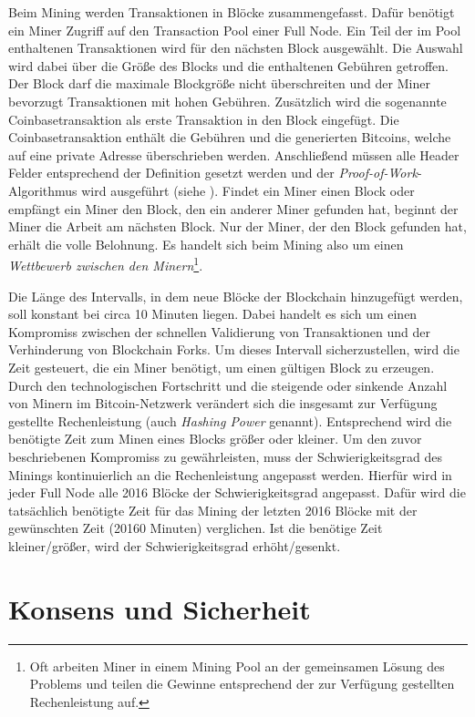 \documentclass[ngerman,runningheads,a4paper]{llncs}[2018/03/10]
\begin{document}
Beim Mining werden Transaktionen in Blöcke zusammengefasst. Dafür benötigt ein Miner Zugriff auf den Transaction Pool einer Full Node. Ein Teil der im Pool enthaltenen Transaktionen wird für den nächsten Block ausgewählt. Die Auswahl wird dabei über die Größe des Blocks und die enthaltenen Gebühren getroffen. Der Block darf die maximale Blockgröße nicht überschreiten und der Miner bevorzugt Transaktionen mit hohen Gebühren. Zusätzlich wird die sogenannte Coinbasetransaktion als erste Transaktion in den Block eingefügt. Die Coinbasetransaktion enthält die Gebühren und die generierten Bitcoins, welche auf eine private Adresse überschrieben werden. Anschließend müssen alle Header Felder entsprechend der Definition gesetzt werden und der \textit{Proof-of-Work}-Algorithmus wird ausgeführt (siehe ). Findet ein Miner einen Block oder empfängt ein Miner den Block, den ein anderer Miner gefunden hat, beginnt der Miner die Arbeit am nächsten Block. Nur der Miner, der den Block gefunden hat, erhält die volle Belohnung. Es handelt sich beim Mining also um einen \textit{Wettbewerb zwischen den Minern}\footnote{Oft arbeiten Miner in einem Mining Pool an der gemeinsamen Lösung des Problems und teilen die Gewinne entsprechend der zur Verfügung gestellten Rechenleistung auf.}.

Die Länge des Intervalls, in dem neue Blöcke der Blockchain hinzugefügt werden, soll konstant bei circa 10 Minuten liegen. Dabei handelt es sich um einen Kompromiss zwischen der schnellen Validierung von Transaktionen und der Verhinderung von Blockchain Forks. Um dieses Intervall sicherzustellen, wird die Zeit gesteuert, die ein Miner benötigt, um einen gültigen Block zu erzeugen. Durch den technologischen Fortschritt und die steigende oder sinkende Anzahl von Minern im Bitcoin-Netzwerk verändert sich die insgesamt zur Verfügung gestellte Rechenleistung (auch \textit{Hashing Power} genannt). Entsprechend wird die benötigte Zeit zum Minen eines Blocks größer oder kleiner. Um den zuvor beschriebenen Kompromiss zu gewährleisten, muss der Schwierigkeitsgrad des Minings kontinuierlich an die Rechenleistung angepasst werden. Hierfür wird in jeder Full Node alle 2016 Blöcke der Schwierigkeitsgrad angepasst. Dafür wird die tatsächlich benötigte Zeit für das Mining der letzten 2016 Blöcke mit der gewünschten Zeit (20160 Minuten) verglichen. Ist die benötige Zeit kleiner/größer, wird der Schwierigkeitsgrad erhöht/gesenkt.

\section{Konsens und Sicherheit}\label{sec:konsens}
\end{document}

